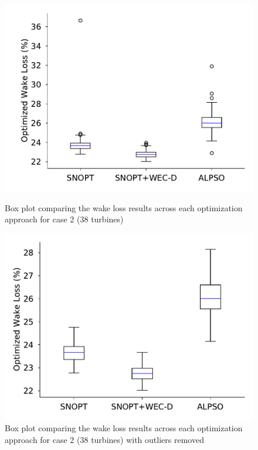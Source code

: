 \documentclass[a4paper]{jpconf}
\begin{document}
\begin{figure}[h!]  
	\centering
	\begin{minipage}[t]{18pc}    
		\centering
		\includegraphics[width=\textwidth, trim={0cm 0cm 0cm 0cm}]{final_images/results/38turbs_results_alpso_percent_wake_loss.pdf}
		\caption{Box plot comparing the wake loss results across each optimization approach for case 2 (38 turbines)}
		\label{fig:38-wake-loss}
	\end{minipage}\hspace{1pc}
	\begin{minipage}[t]{18pc}    
		\centering
		\includegraphics[width=\textwidth, trim={0cm 0cm 0cm 0cm}]{final_images/results/38turbs_results_alpso_percent_wake_loss_zoom.pdf}
		\caption{Box plot comparing the wake loss results across each optimization approach for case 2 (38 turbines) with outliers removed}
		\label{fig:38-wake-loss-no-outliers}
	\end{minipage}
\end{figure}
\end{document}
